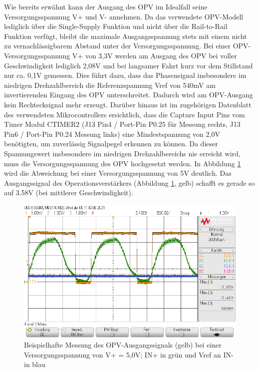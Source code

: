 Wie bereits erwähnt kann der Ausgang des OPV im Idealfall seine Versorgungsspannung V+ und V- annehmen. Da das verwendete OPV-Modell lediglich über die Single-Supply Funktion und nicht über die Rail-to-Rail Funktion verfügt, bleibt die maximale Ausgangsspannung stets mit einem nicht zu vernachlässigbarem Abstand unter der Versorgungsspannung. Bei einer \ac{OPV}-Versorgungsspannung V+ von 3,3V werden am Ausgang des OPV bei voller Geschwindigkeit lediglich 2,08V und bei langsamer Fahrt kurz vor dem Stillstand nur ca. 0,1V gemessen. Dies führt dazu, dass das Phasensignal insbesondere im niedrigen Drehzahlbereich die Referenzspannung Vref von 540mV am invertierenden Eingang des OPV unterschreitet. Dadurch wird am OPV-Ausgang kein Rechtecksignal mehr erzeugt. Darüber hinaus ist im zugehörigen Datenblatt des verwendeten Mikrocontrollers ersichtlich, dass die Capture Input Pins vom Timer Modul CTIMER2 (J13 Pin4 / Port-Pin P0.25 für Messung rechts, J13 Pin6 / Port-Pin P0.24 Messung links) eine Mindestspannung von 2,0V benötigten, um zuverlässig Signalpegel erkennen zu können. Da dieser Spannungswert insbesondere im niedrigen Drehzahlbereichs nie erreicht wird, muss die Versorgungsspannung des OPV hochgesetzt werden. In Abbildung \ref{fig:inpInrefOpvOut} wird die Abweichung bei einer Versorgungsspannung von 5V deutlich. Das Ausgangssignal des Operationsverstärkers (Abbildung \ref{fig:inpInrefOpvOut}, gelb) schafft es gerade so auf 3.58V (bei mittlerer Geschwindigkeit).\vspace{11pt}

\begin{figure}[H] %
\includegraphics[width=.95\textwidth]{sec4/images/inp_inref_opv_out} 
\centering
\captionsetup{width=.95\textwidth}
\caption[Beispielhafte Messung des OPV-Ausgangssignals bei V+ = 5,0V;]{Beispielhafte Messung des OPV-Ausgangssignals (gelb) bei einer Versorgungsspannung von V+ = 5,0V;  IN+ in grün und Vref an IN- in blau}\centering
\label{fig:inpInrefOpvOut}
\end{figure}


